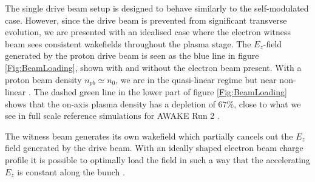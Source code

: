 \documentclass[aps,prstab,reprint,amsmath,amssymb,groupedaddress]{revtex4-1}
\begin{document}

The single drive beam setup is designed to behave similarly to the self-modulated case. However, since the drive beam is
prevented from significant transverse evolution, we are presented with an idealised case where the electron witness beam
sees consistent wakefields throughout the plasma stage. The $E_{z}$-field generated by the proton drive beam is seen as
the blue line in figure \ref{Fig:BeamLoading}, shown with and without the electron beam present. With a proton beam
density $n_{pb} \simeq n_{0}$, we are in the quasi-linear regime but near non-linear \cite{rosenzweig:2010}. The dashed
green line in the lower part of figure \ref{Fig:BeamLoading} shows that the on-axis plasma density has a depletion of
$67\%$, close to what we see in full scale reference simulations for AWAKE Run 2 \cite{awake_collaboration:2016}.



The witness beam generates its own wakefield which partially cancels out the $E_{z}$ field generated by the drive beam.
With an ideally shaped electron beam charge profile it is possible to optimally load the field in such a way that the
accelerating $E_{z}$ is constant along the bunch \cite{katsouleas:1987, tzoufras:2009}.

\end{document}
